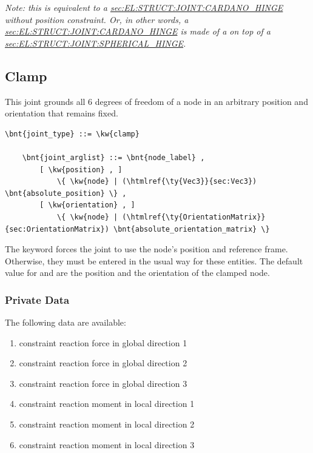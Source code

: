 \emph{Note: this is equivalent to a
\hyperref{\kw{cardano hinge}}{\kw{cardano hinge} (see Section~}{)}{sec:EL:STRUCT:JOINT:CARDANO_HINGE}
without position constraint.
Or, in other words, a 
\hyperref{\kw{cardano hinge}}{\kw{cardano hinge} (see Section~}{)}{sec:EL:STRUCT:JOINT:CARDANO_HINGE}
is made of a  on top of a 
\hyperref{\kw{spherical hinge}}{\kw{spherical hinge} (see Section~}{)}{sec:EL:STRUCT:JOINT:SPHERICAL_HINGE}.
}



\subsection{Clamp}
This joint grounds all 6 degrees of freedom of a node
in an arbitrary position and orientation that remains fixed.
\begin{Verbatim}[commandchars=\\\{\}]
    \bnt{joint_type} ::= \kw{clamp}

    \bnt{joint_arglist} ::= \bnt{node_label} ,
        [ \kw{position} , ]
            \{ \kw{node} | (\htmlref{\ty{Vec3}}{sec:Vec3}) \bnt{absolute_position} \} ,
        [ \kw{orientation} , ]
            \{ \kw{node} | (\htmlref{\ty{OrientationMatrix}}{sec:OrientationMatrix}) \bnt{absolute_orientation_matrix} \}
\end{Verbatim}
The keyword  forces the joint to use
the node's position and reference frame. Otherwise, they must be entered
in the usual way for these entities.
The default value for  and 
are the position and the orientation of the clamped node.

\subsubsection{Private Data}
The following data are available:
\begin{enumerate}
\item {} constraint reaction force in global direction 1
\item {} constraint reaction force in global direction 2
\item {} constraint reaction force in global direction 3
\item {} constraint reaction moment in local direction 1
\item {} constraint reaction moment in local direction 2
\item {} constraint reaction moment in local direction 3
\end{enumerate}




